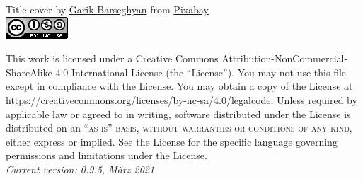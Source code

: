 \noindent Title cover by \href{https://pixabay.com/users/insspirito-1851261/?utm_source=link-attribution&amp;utm_medium=referral&amp;utm_campaign=image&amp;utm_content=1280089}{Garik Barseghyan} from \href{https://pixabay.com/?utm_source=link-attribution&amp;utm_medium=referral&amp;utm_campaign=image&amp;utm_content=1280089}{Pixabay}\\

\includegraphics[]{figures/index/license.png}

\noindent This work is licensed under a Creative Commons Attribution-NonCommercial-ShareAlike 4.0 International License (the ``License''). You may not use this file except in compliance with the License. You may obtain a copy of the License at \url{https://creativecommons.org/licenses/by-nc-sa/4.0/legalcode}. Unless required by applicable law or agreed to in writing, software distributed under the License is distributed on an \textsc{``as is'' basis, without warranties or conditions of any kind}, either express or implied. See the License for the specific language governing permissions and limitations under the License.\\ %

\noindent \textit{Current version: 0.9.5, März 2021} %
\newpage
{}
